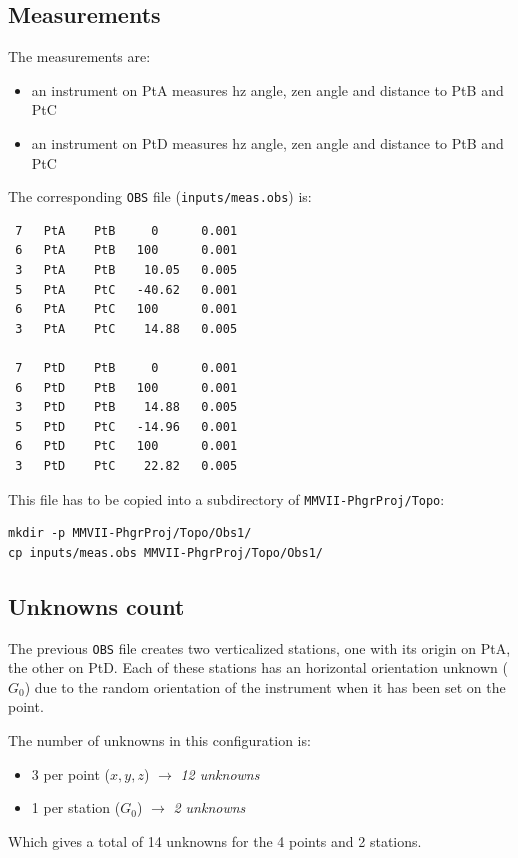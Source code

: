 \subsection{Measurements}
The measurements are:
\begin{itemize}
   \item an instrument on PtA measures hz angle, zen angle and distance to PtB and PtC
   \item an instrument on PtD measures hz angle, zen angle and distance to PtB and PtC
\end{itemize}
The corresponding \texttt{OBS} file (\texttt{inputs/meas.obs}) is:
\begin{verbatim}
 7   PtA    PtB     0      0.001
 6   PtA    PtB   100      0.001
 3   PtA    PtB    10.05   0.005
 5   PtA    PtC   -40.62   0.001
 6   PtA    PtC   100      0.001
 3   PtA    PtC    14.88   0.005

 7   PtD    PtB     0      0.001
 6   PtD    PtB   100      0.001
 3   PtD    PtB    14.88   0.005
 5   PtD    PtC   -14.96   0.001
 6   PtD    PtC   100      0.001
 3   PtD    PtC    22.82   0.005
\end{verbatim}
This file has to be copied into a subdirectory of \texttt{MMVII-PhgrProj/Topo}:
\begin{lstlisting}
mkdir -p MMVII-PhgrProj/Topo/Obs1/
cp inputs/meas.obs MMVII-PhgrProj/Topo/Obs1/
\end{lstlisting}


\subsection{Unknowns count}

The previous \texttt{OBS} file creates two verticalized stations, one with its origin on PtA, the other on PtD.
Each of these stations has an horizontal orientation unknown ($G_0$) due to the random orientation of the instrument
when it has been set on the point.

The number of unknowns in this configuration is:
\begin{itemize}
   \item 3 per point ($x, y, z$)  $\rightarrow$ \textit{12 unknowns}
   \item 1 per station ($G_0$)  $\rightarrow$ \textit{2 unknowns}
\end{itemize}

Which gives a total of 14 unknowns for the 4 points and 2 stations.
\\

